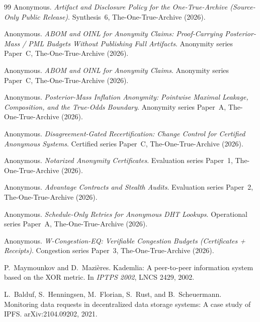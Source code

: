 \documentclass[11pt]{article}
\begin{document}
\begin{thebibliography}{99}\small
{}
Anonymous.
\newblock \emph{Artifact and Disclosure Policy for the One-True-Archive (Source-Only Public Release)}.
\newblock Synthesis~6, The-One-True-Archive (2026).

Anonymous.
\newblock \emph{ABOM and OINL for Anonymity Claims: Proof-Carrying Posterior-Mass / PML Budgets Without Publishing Full Artifacts}.
\newblock Anonymity series Paper~C, The-One-True-Archive (2026).

Anonymous.
\newblock \emph{ABOM and OINL for Anonymity Claims}.
\newblock Anonymity series Paper~C, The-One-True-Archive (2026).

Anonymous.
\newblock \emph{Posterior-Mass Inflation Anonymity: Pointwise Maximal Leakage, Composition, and the True-Odds Boundary}.
\newblock Anonymity series Paper~A, The-One-True-Archive (2026).

Anonymous.
\newblock \emph{Disagreement-Gated Recertification: Change Control for Certified Anonymous Systems}.
\newblock Certified series Paper~C, The-One-True-Archive (2026).

Anonymous.
\newblock \emph{Notarized Anonymity Certificates}.
\newblock Evaluation series Paper~1, The-One-True-Archive (2026).

Anonymous.
\newblock \emph{Advantage Contracts and Stealth Audits}.
\newblock Evaluation series Paper~2, The-One-True-Archive (2026).

Anonymous.
\newblock \emph{Schedule-Only Retries for Anonymous DHT Lookups}.
\newblock Operational series Paper~A, The-One-True-Archive (2026).

Anonymous.
\newblock \emph{W-Congestion-EQ: Verifiable Congestion Budgets (Certificates + Receipts)}.
\newblock Congestion series Paper~3, The-One-True-Archive (2026).

P.~Maymounkov and D.~Mazi\`eres.
\newblock Kademlia: A peer-to-peer information system based on the XOR metric.
\newblock In \emph{IPTPS 2002}, LNCS 2429, 2002.

L.~Balduf, S.~Henningsen, M.~Florian, S.~Rust, and B.~Scheuermann.
\newblock Monitoring data requests in decentralized data storage systems: A case study of IPFS.
\newblock arXiv:2104.09202, 2021.


\end{thebibliography}
\end{document}
